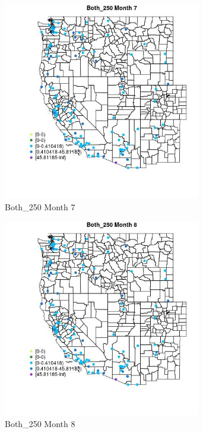 \begin{figure} 
\centering  
\includegraphics[width=0.77\textwidth]{Code_Outputs/Report_ML_input_PM25_Step4_part_e_de_duplicated_aves_MapObsMo7Both_250.jpg} 
\caption{\label{fig:Report_ML_input_PM25_Step4_part_e_de_duplicated_avesMapObsMo7Both_250}Both_250 Month 7} 
\end{figure} 
 

\clearpage 

\begin{figure} 
\centering  
\includegraphics[width=0.77\textwidth]{Code_Outputs/Report_ML_input_PM25_Step4_part_e_de_duplicated_aves_MapObsMo8Both_250.jpg} 
\caption{\label{fig:Report_ML_input_PM25_Step4_part_e_de_duplicated_avesMapObsMo8Both_250}Both_250 Month 8} 
\end{figure} 
 

